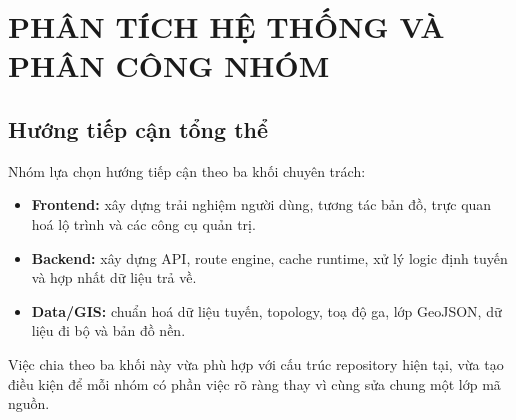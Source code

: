 \documentclass[../DoAn.tex]{subfiles}
\begin{document}
\chapter{PHÂN TÍCH HỆ THỐNG VÀ PHÂN CÔNG NHÓM}
\label{chapter:methodology}

\section{Hướng tiếp cận tổng thể}
Nhóm lựa chọn hướng tiếp cận theo ba khối chuyên trách:
\begin{itemize}
    \item \textbf{Frontend:} xây dựng trải nghiệm người dùng, tương tác bản đồ, trực quan hoá lộ trình và các công cụ quản trị.
    \item \textbf{Backend:} xây dựng API, route engine, cache runtime, xử lý logic định tuyến và hợp nhất dữ liệu trả về.
    \item \textbf{Data/GIS:} chuẩn hoá dữ liệu tuyến, topology, toạ độ ga, lớp GeoJSON, dữ liệu đi bộ và bản đồ nền.
\end{itemize}

Việc chia theo ba khối này vừa phù hợp với cấu trúc repository hiện tại, vừa tạo điều kiện để mỗi nhóm có phần việc rõ ràng thay vì cùng sửa chung một lớp mã nguồn.
\end{document}
